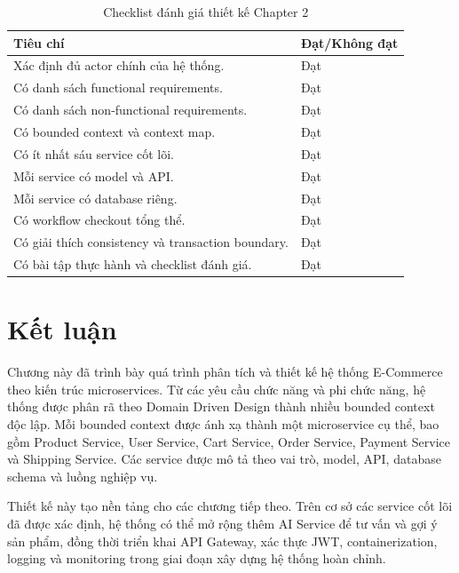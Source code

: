 \documentclass[../main.tex]{subfiles}
\begin{document}
\begin{table}[H]
    \centering
    \caption{Checklist đánh giá thiết kế Chapter 2}
    \label{tab:chapter2-checklist}
    \begin{tabular}{|p{}|p{}|}
        \hline
        \rowcolor{primary!35}
        \textbf{Tiêu chí} & \textbf{Đạt/Không đạt} \\
        \hline
        Xác định đủ actor chính của hệ thống. & Đạt \\
        \hline
        Có danh sách functional requirements. & Đạt \\
        \hline
        Có danh sách non-functional requirements. & Đạt \\
        \hline
        Có bounded context và context map. & Đạt \\
        \hline
        Có ít nhất sáu service cốt lõi. & Đạt \\
        \hline
        Mỗi service có model và API. & Đạt \\
        \hline
        Mỗi service có database riêng. & Đạt \\
        \hline
        Có workflow checkout tổng thể. & Đạt \\
        \hline
        Có giải thích consistency và transaction boundary. & Đạt \\
        \hline
        Có bài tập thực hành và checklist đánh giá. & Đạt \\
        \hline
    \end{tabular}
\end{table}

\section{Kết luận}
\label{section:2.11}

Chương này đã trình bày quá trình phân tích và thiết kế hệ thống E-Commerce theo kiến trúc microservices. Từ các yêu cầu chức năng và phi chức năng, hệ thống được phân rã theo Domain Driven Design thành nhiều bounded context độc lập. Mỗi bounded context được ánh xạ thành một microservice cụ thể, bao gồm Product Service, User Service, Cart Service, Order Service, Payment Service và Shipping Service. Các service được mô tả theo vai trò, model, API, database schema và luồng nghiệp vụ.

Thiết kế này tạo nền tảng cho các chương tiếp theo. Trên cơ sở các service cốt lõi đã được xác định, hệ thống có thể mở rộng thêm AI Service để tư vấn và gợi ý sản phẩm, đồng thời triển khai API Gateway, xác thực JWT, containerization, logging và monitoring trong giai đoạn xây dựng hệ thống hoàn chỉnh.
\end{document}
